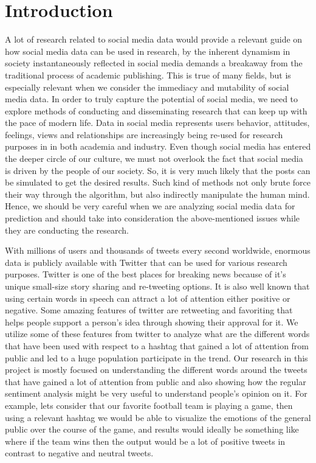 
\maketitle

\section{Introduction}

A lot of research related to social media data would provide a relevant guide on how 
social media data can be used in research, by the inherent dynamism in society 
instantaneously reflected in social media demands a breakaway from the traditional 
process of academic publishing. This is true of many fields, but is 
especially relevant when we consider the immediacy and mutability of 
social media data. In order to truly capture the potential of social 
media, we need to explore methods of conducting and disseminating 
research that can keep up with the pace of modern life. Data in social media 
represents users behavior, attitudes, feelings, views and relationships are
increasingly being re-used for research purposes in in both academia and industry. 
Even though social media has entered the deeper circle of our culture, we must 
not overlook the fact that social media is driven by the people of our society. 
So, it is very much likely that the posts can be simulated to get the desired 
results. Such kind of methods not only brute force their way through the 
algorithm, but also indirectly manipulate the human mind. Hence, we
should be very careful when we are analyzing social media data for prediction 
and should take into consideration the above-mentioned issues while they are 
conducting the research.

With millions of users and thousands of tweets every second worldwide, enormous 
data is publicly available with Twitter that can be used for 
various research purposes. Twitter is one of the best places for breaking news 
because of it’s unique small-size story sharing and re-tweeting options. 
It is also well known that using certain words in speech can attract a lot of attention 
either positive or negative. Some amazing features of twitter are retweeting and 
favoriting that helps people support a person’s idea through showing their 
approval for it. We utilize some of these features from twitter to analyze what are the 
different words that have been used with respect to a hashtag that gained a lot of 
attention from public and led to a huge population participate in the trend. 
Our research in this project is mostly focused on understanding the different 
words around the tweets that have gained a lot of attention from public and also 
showing how the regular sentiment analysis might be very useful to understand 
people’s opinion on it. For example, lets consider that our favorite 
football team is playing a game, then using a relevant hashtag we would be able 
to visualize the emotions of the general public over the course of the game, and 
results would ideally be something like where if the team wins then the output 
would be a lot of positive tweets in contrast to negative and neutral tweets. 


